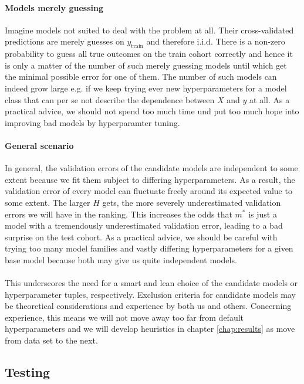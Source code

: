 \paragraph{Models merely guessing}
Imagine models not suited to deal with the problem at all. Their cross-validated predictions are 
merely guesses on $y_\text{train}$ and therefore i.i.d. There is a non-zero probability to guess
all true outcomes on the train cohort correctly and hence it is only a matter of the number of 
such merely guessing models until which get the minimal possible error for one of them. The number of 
such models can indeed grow large e.g. if we keep trying ever new hyperparameters for a model class 
that can per se not describe the dependence between $X$ and $y$ at all.
As a practical advice, we should not spend too much time und put too much hope into improving 
bad models by hyperparamter tuning.

\paragraph{General scenario}
In general, the validation errors of the candidate models are independent to some extent because we fit them
subject to differing hyperparameters. As a result, the validation error of every model can 
fluctuate freely around its expected value to some extent. The larger $H$ gets, the 
more severely underestimated validation errors we will have in the ranking. This 
increases the odds that $m^*$ is just a model with a tremendously underestimated validation error, 
leading to a bad surprise on the test cohort. As a practical advice, we should be careful with 
trying too many model families and vastly differing hyperparameters for a given base model 
because both may give us quite independent models.

\paragraph{}
This underscores the need for a smart and lean choice of the candidate models or hyperparameter 
tuples, respectively. Exclusion criteria for candidate models may be theoretical considerations
and experience by both us and others. Concerning experience, this means we will not move away too 
far from default hyperparameters and we will develop heuristics in chapter \ref{chap:results} as 
move from data set to the next.

\subsection{Testing}

